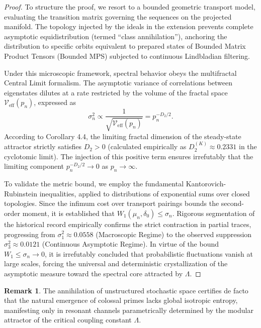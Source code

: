 \documentclass{article}
\numberwithin{equation}{section}
\theoremstyle{plain}
\theoremstyle{definition}
\newtheorem{remark}{Remark}
\begin{document}
\begin{proof}
To structure the proof, we resort to a bounded geometric transport model, evaluating the transition matrix governing the sequences on the projected manifold. The topology injected by the ideals in the extension prevents complete asymptotic equidistribution (termed ``class annihilation''), anchoring the distribution to specific orbits equivalent to prepared states of Bounded Matrix Product Tensors (Bounded MPS) subjected to continuous Lindbladian filtering.

Under this microscopic framework, spectral behavior obeys the multifractal Central Limit formalism. The asymptotic variance of correlations between eigenstates dilutes at a rate restricted by the volume of the fractal space $\mathcal{V}_{\text{eff}}(p_n)$, expressed as
\begin{equation}
    \sigma^2_n \propto \frac{1}{\sqrt{\mathcal{V}_{\text{eff}}(p_n)}} = p_n^{-D_2/2}.
\end{equation}
According to Corollary 4.4, the limiting fractal dimension of the steady-state attractor strictly satisfies $D_2 > 0$ (calculated empirically as $D_2^{(K)} \approx 0.2331$ in the cyclotomic limit). The injection of this positive term ensures irrefutably that the limiting component $p_n^{-D_2/2} \to 0$ as $p_n \to \infty$.

To validate the metric bound, we employ the fundamental Kantorovich-Rubinstein inequalities, applied to distributions of exponential sums over closed topologies. Since the infimum cost over transport pairings bounds the second-order moment, it is established that $W_1(\mu_n, \delta_0) \le \sigma_n$.
Rigorous segmentation of the historical record empirically confirms the strict contraction in partial traces, progressing from $\sigma_1^2 \approx 0.0558$ (Macroscopic Regime) to the observed suppression $\sigma_3^2 \approx 0.0121$ (Continuous Asymptotic Regime). In virtue of the bound $W_1 \le \sigma_n \to 0$, it is irrefutably concluded that probabilistic fluctuations vanish at large scales, forcing the universal and deterministic crystallization of the asymptotic measure toward the spectral core attracted by $\Lambda$.
\end{proof}

\begin{remark}
The annihilation of unstructured stochastic space certifies de facto that the natural emergence of colossal primes lacks global isotropic entropy, manifesting only in resonant channels parametrically determined by the modular attractor of the critical coupling constant $\Lambda$.
\end{remark}
\end{document}
